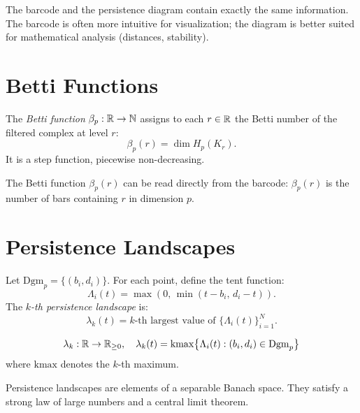 \begin{remark}
The barcode and the persistence diagram contain exactly the same
information. The barcode is often more intuitive for visualization;
the diagram is better suited for mathematical analysis (distances,
stability).
\end{remark}

\section{Betti Functions}

\begin{definition}
The \emph{Betti function} $\beta_p : \mathbb{R} \to \mathbb{N}$ assigns to each
$r \in \mathbb{R}$ the Betti number of the filtered complex at level $r$:
\[
  \beta_p(r) = \dim H_p(K_r).
\]
It is a step function, piecewise non-decreasing.
\end{definition}

\begin{proposition}
The Betti function $\beta_p(r)$ can be read directly from the barcode:
$\beta_p(r)$ is the number of bars containing $r$ in dimension $p$.
\end{proposition}

\section{Persistence Landscapes}

\begin{definition}
Let $\mathrm{Dgm}_p = \{(b_i, d_i)\}$. For each point, define the
tent function:
\[
  \Lambda_i(t) = \max\left(0,\, \min(t - b_i,\, d_i - t)\right).
\]
The \emph{$k$-th persistence landscape} is:
\[
  \lambda_k(t) = k\text{-th largest value of }
  \{\Lambda_i(t)\}_{i=1}^N.
\]
\end{definition}

\begin{keyformulas}[title=\textbf{Persistence Landscape}]
\[
  \lambda_k : \mathbb{R} \to \mathbb{R}_{\geq 0}, \quad
  \lambda_k(t) = \mathrm{kmax}\big\{\Lambda_i(t) : (b_i, d_i)
  \in \mathrm{Dgm}_p\big\}
\]
where $\mathrm{kmax}$ denotes the $k$-th maximum.
\end{keyformulas}

\begin{theorem}[Bubenik, 2015]
Persistence landscapes are elements of a separable Banach space. They
satisfy a strong law of large numbers and a central limit theorem.
\end{theorem}

